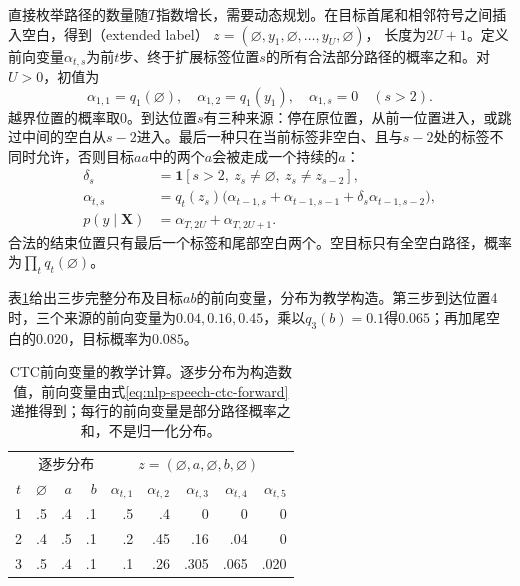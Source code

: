 直接枚举路径的数量随$T$指数增长，需要动态规划。在目标首尾和相邻符号之间插入空白，得到（extended label）
$z=(\varnothing,y_1,\varnothing,\ldots,y_U,\varnothing)$，
长度为$2U+1$。定义前向变量$\alpha_{t,s}$为前$t$步、终于扩展标签位置$s$的所有合法部分路径的概率之和。对$U>0$，初值为
\begin{equation}
 \alpha_{1,1}=q_1(\varnothing),\quad
 \alpha_{1,2}=q_1(y_1),\quad
 \alpha_{1,s}=0\quad(s>2).
 \label{eq:nlp-speech-ctc-initial}
\end{equation}
越界位置的概率取0。到达位置$s$有三种来源：停在原位置，从前一位置进入，或跳过中间的空白从$s-2$进入。最后一种只在当前标签非空白、且与$s-2$处的标签不同时允许，否则目标$aa$中的两个$a$会被走成一个持续的$a$：
\begin{equation}
\begin{aligned}
 \delta_s&=\mathbf{1}[s>2,\ z_s\ne\varnothing,\ z_s\ne z_{s-2}],\\
 \alpha_{t,s}
 &=q_t(z_s)\bigl(\alpha_{t-1,s}+\alpha_{t-1,s-1}
                    +\delta_s\alpha_{t-1,s-2}\bigr),\\
 p(y\mid\bm{X})&=\alpha_{T,2U}+\alpha_{T,2U+1}.
\end{aligned}
\label{eq:nlp-speech-ctc-forward}
\end{equation}
合法的结束位置只有最后一个标签和尾部空白两个。空目标只有全空白路径，概率为$\prod_tq_t(\varnothing)$。

表\ref{tab:nlp-speech-ctc-numbers}给出三步完整分布及目标$ab$的前向变量，分布为教学构造。第三步到达位置4时，三个来源的前向变量为$0.04,0.16,0.45$，乘以$q_3(b)=0.1$得$0.065$；再加尾空白的$0.020$，目标概率为$0.085$。

\begin{table}[htbp]
  \centering
  \begin{tabular}{@{}crrrrrrrr@{}}
    \toprule
    & \multicolumn{3}{c}{逐步分布} & \multicolumn{5}{c}{$z=(\varnothing,a,\varnothing,b,\varnothing)$}\\
    $t$ & $\varnothing$ & $a$ & $b$ & $\alpha_{t,1}$ & $\alpha_{t,2}$ & $\alpha_{t,3}$ & $\alpha_{t,4}$ & $\alpha_{t,5}$\\
    \midrule
    1 & .5 & .4 & .1 & .5 & .4 & 0 & 0 & 0\\
    2 & .4 & .5 & .1 & .2 & .45 & .16 & .04 & 0\\
    3 & .5 & .4 & .1 & .1 & .26 & .305 & .065 & .020\\
    \bottomrule
  \end{tabular}
  \caption{CTC前向变量的教学计算。逐步分布为构造数值，前向变量由式\eqref{eq:nlp-speech-ctc-forward}递推得到；每行的前向变量是部分路径概率之和，不是归一化分布。}
  \label{tab:nlp-speech-ctc-numbers}
\end{table}

